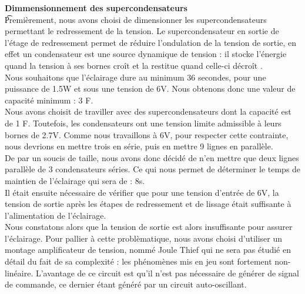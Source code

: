 \documentclass[a4paper,12pt]{article} %
\begin{document}
\t {\large \bf Dimmensionnement des supercondensateurs}\\


\t Premièrement, nous avons choisi de dimensionner les supercondensateurs permettant le redressement de la tension. Le supercondensateur en sortie de l'étage de redressement permet de réduire l'ondulation de la tension de sortie, en effet un condensateur est une source dynamique de tension : il stocke l'énergie quand la tension à ses bornes croît et la restitue quand celle-ci décroît . \\

    Nous souhaitons que l'éclairage dure au minimum 36 secondes, pour une puissance de 1.5W et sous une tension de 6V. Nous obtenons donc une valeur de capacité minimum : 3 F. \\
    
    Nous avons choisit de traviller avec des supercondensateurs dont la capacité est de 1 F. Toutefois, les condensateurs ont une tension limite admissible à leurs bornes de 2.7V. Comme nous travaillons à 6V, pour respecter cette contrainte, nous devrions en mettre trois en série, puis en mettre 9 lignes en parallèle. \\
    
    De par un soucis de taille, nous avons donc décidé de n'en mettre que deux lignes parallèle de 3 condensateurs séries. Ce qui nous permet de déterminer le temps de maintien de l'éclairage qui sera de : 8s.\\
    
Il était ensuite nécessaire de vérifier que pour une tension d'entrée de 6V, la tension de sortie après les étapes de redressement et de lissage était suffisante à l'alimentation de l'éclairage.\\

Nous constatons alors que la tension de sortie est alors insuffisante pour assurer l'éclairage. Pour pallier à cette problèmatique, nous avons choisi d'utiliser un montage amplificateur de tension, nommé Joule Thief qui ne sera pas étudié en détail du fait de sa complexité : les phénomènes mis en jeu sont fortement non-linéaire. L'avantage de ce circuit est qu'il n'est pas nécessaire de générer de signal de commande, ce dernier étant généré par un circuit auto-oscillant.\\

\end{document}
